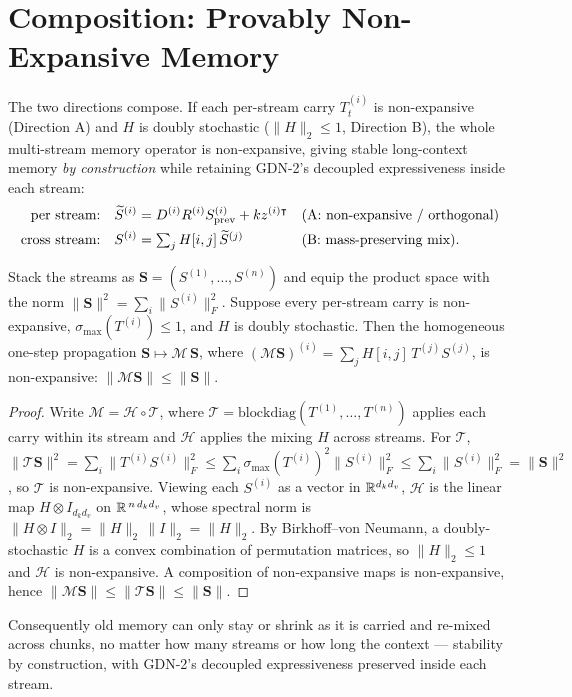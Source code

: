 \documentclass[11pt,letterpaper,logo]{yalearxiv}
\newcommand{\smax}{\sigma_{\max}}
\newcommand{\Tcarry}{T}          %
\begin{document}
\section{Composition: Provably Non-Expansive Memory}
\label{sec:compose}

The two directions compose. If each per-stream carry $\Tcarry_t^{(i)}$ is
non-expansive (Direction A) and $H$ is doubly stochastic
($\|H\|_2 \le 1$, Direction B), the whole multi-stream memory operator is
non-expansive, giving stable long-context memory \emph{by construction} while
retaining GDN-2's decoupled expressiveness inside each stream:
\begin{align}
  \text{per stream:}\quad & \widetilde{S}^{(i)}
    = D^{(i)} R^{(i)} S^{(i)}_{\text{prev}} + k z^{(i)\intercal}
    && \text{(A: non-expansive / orthogonal)}\\
  \text{cross stream:}\quad & S^{(i)}
    = \textstyle\sum_j H[i,j]\, \widetilde{S}^{(j)}
    && \text{(B: mass-preserving mix)} .
\end{align}
\begin{proposition}
\label{prop:compose}
Stack the streams as $\mathbf S = (S^{(1)},\dots,S^{(n)})$ and equip the product space
with the norm $\|\mathbf S\|^2 = \sum_i \|S^{(i)}\|_F^2$. Suppose every per-stream carry
is non-expansive, $\smax(\Tcarry^{(i)}) \le 1$, and $H$ is doubly stochastic. Then the
homogeneous one-step propagation
$\mathbf S \mapsto \mathcal{M}\,\mathbf S$, where
$(\mathcal M \mathbf S)^{(i)} = \sum_j H[i,j]\,\Tcarry^{(j)} S^{(j)}$, is non-expansive:
$\|\mathcal M \mathbf S\| \le \|\mathbf S\|$.
\end{proposition}
\begin{proof}
Write $\mathcal M = \mathcal H \circ \mathcal T$, where
$\mathcal T = \mathrm{blockdiag}(\Tcarry^{(1)},\dots,\Tcarry^{(n)})$ applies each carry
within its stream and $\mathcal H$ applies the mixing $H$ across streams. For $\mathcal T$,
$\|\mathcal T\mathbf S\|^2 = \sum_i \|\Tcarry^{(i)} S^{(i)}\|_F^2
\le \sum_i \smax(\Tcarry^{(i)})^2 \|S^{(i)}\|_F^2 \le \sum_i \|S^{(i)}\|_F^2 = \|\mathbf S\|^2$,
so $\mathcal T$ is non-expansive. Viewing each $S^{(i)}$ as a vector in $\mathbb{R}^{d_k d_v}$,
$\mathcal H$ is the linear map $H \otimes I_{d_k d_v}$ on $\mathbb{R}^{\,n\, d_k d_v}$, whose
spectral norm is $\|H\otimes I\|_2 = \|H\|_2\,\|I\|_2 = \|H\|_2$. By
Birkhoff--von Neumann, a doubly-stochastic $H$ is a convex combination of permutation
matrices, so $\|H\|_2 \le 1$ and $\mathcal H$ is non-expansive. A composition of
non-expansive maps is non-expansive, hence
$\|\mathcal M\mathbf S\| \le \|\mathcal T\mathbf S\| \le \|\mathbf S\|$.
\end{proof}
Consequently old memory can only stay or shrink as it is carried and re-mixed across
chunks, no matter how many streams or how long the context --- stability by
construction, with GDN-2's decoupled expressiveness preserved inside each stream.
\end{document}
